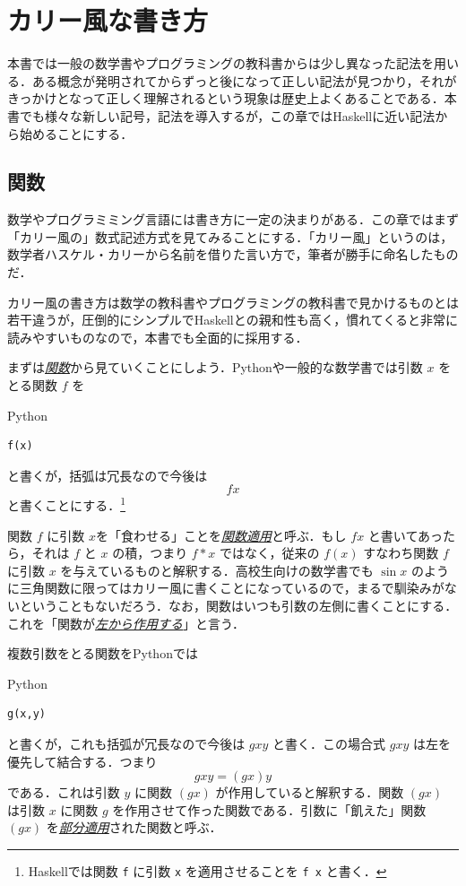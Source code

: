 \documentclass[a4paper]{jsbook}
\newcommand{\programminglanguage}[1]{\textsf{#1}}
\newcommand{\haskell}{\programminglanguage{Haskell}}
\newcommand{\python}{\programminglanguage{Python}}
\newenvironment{leader}{\begingroup}{\endgroup}
\newcommand{\keyword}[1]{{\underline{\emph{#1}}}}
\newcommand{\code}[1]{\texttt{#1}}
\newenvironment{pythoncode}{\begin{itembox}[r]{\python}}{\end{itembox}}
\begin{document}
\chapter{カリー風な書き方}
\begin{leader}
本書では一般の数学書やプログラミングの教科書からは少し異なった記法を用いる．ある概念が発明されてからずっと後になって正しい記法が見つかり，それがきっかけとなって正しく理解されるという現象は歴史上よくあることである．本書でも様々な新しい記号，記法を導入するが，この章では\haskell に近い記法から始めることにする．
\end{leader}

\section{関数}

数学やプログラミミング言語には書き方に一定の決まりがある．この章ではまず「カリー風の」数式記述方式を見てみることにする．「カリー風」というのは，数学者ハスケル・カリーから名前を借りた言い方で，筆者が勝手に命名したものだ．

カリー風の書き方は数学の教科書やプログラミングの教科書で見かけるものとは若干違うが，圧倒的にシンプルで\haskell との親和性も高く，慣れてくると非常に読みやすいものなので，本書でも全面的に採用する．

まずは\keyword{関数}から見ていくことにしよう．\python や一般的な数学書では引数 $x$ をとる関数 $f$ を
\begin{pythoncode}
\begin{verbatim}
f(x)
\end{verbatim}
\end{pythoncode}
と書くが，括弧は冗長なので今後は
\begin{equation}
fx
\end{equation}
と書くことにする．\footnote{\haskell では関数 \code{f} に引数 \code{x} を適用させることを  \code{f x} と書く．}


関数 $f$ に引数 $x$を「食わせる」ことを\keyword{関数適用}と呼ぶ．もし $fx$ と書いてあったら，それは $f$ と $x$ の積，つまり $f*x$ ではなく，従来の $f(x)$ すなわち関数 $f$ に引数 $x$ を与えているものと解釈する．高校生向けの数学書でも $\sin x$ のように三角関数に限ってはカリー風に書くことになっているので，まるで馴染みがないということもないだろう．なお，関数はいつも引数の左側に書くことにする．これを「関数が\keyword{左から作用する}」と言う．

複数引数をとる関数を\python では
\begin{pythoncode}
\begin{verbatim}
g(x,y)
\end{verbatim}
\end{pythoncode}
と書くが，これも括弧が冗長なので今後は $gxy$ と書く．この場合式 $gxy$ は左を優先して結合する．つまり
\begin{equation}
gxy=(gx)y
\end{equation}
である．これは引数 $y$ に関数 $(gx)$ が作用していると解釈する．関数 $(gx)$ は引数 $x$ に関数 $g$ を作用させて作った関数である．引数に「飢えた」関数 $(gx)$ を\keyword{部分適用}された関数と呼ぶ．
\end{document}
